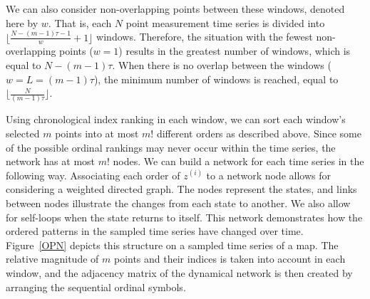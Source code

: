 \documentclass[%
 aip,
 amsmath,amssymb,
 reprint,%
]{revtex4-1}
\begin{document}
We can also consider non-overlapping points between these windows, denoted here by $w$.  That is, each $N$ point measurement time series is divided into  $\lfloor\frac{N-(m-1)\tau-1}{w} + 1\rfloor$ windows. Therefore, the situation with the fewest non-overlapping points ($w = 1$) results in the greatest number of windows, which is equal to $N - (m - 1)\tau$. When there is no overlap between the windows ($w = L = (m - 1)\tau$), the minimum number of windows is reached, equal to $\lfloor \frac{N}{(m - 1)\tau} \rfloor$.

Using chronological index ranking in each window, we can sort each window's selected $m$ points into at most $m!$ different orders as described above. Since some of the possible ordinal rankings may never occur within the time series, the network has at most $m!$ nodes. We can build a network for each time series in the following way. Associating each order of $z^{(i)}$ to a network node allows for considering a weighted directed graph. The nodes represent the states, and links between nodes illustrate the changes from each state to another. We also allow for self-loops when the state returns to itself. This network demonstrates how the ordered patterns in the sampled time series have changed over time. Figure~\ref{OPN} depicts this structure on a sampled time series of a map. The relative magnitude of $m$ points and their indices is taken into account in each window, and the adjacency matrix of the dynamical network is then created by arranging the sequential ordinal symbols.
\end{document}
